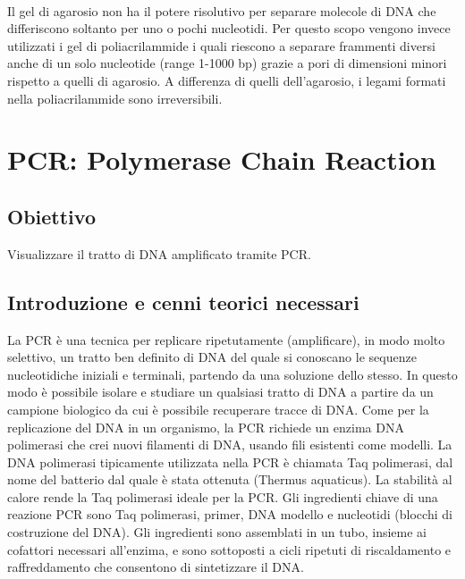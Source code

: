 \documentclass{extarticle}
\begin{document}
\paragraph{}Il gel di agarosio non ha il potere risolutivo per separare molecole di DNA che differiscono soltanto per uno o pochi nucleotidi. Per questo scopo
vengono invece utilizzati i gel di poliacrilammide i quali riescono a separare frammenti diversi anche di un solo nucleotide
(range 1-1000 bp) grazie a pori di dimensioni minori rispetto a quelli di agarosio. A differenza di quelli
dell'agarosio, i legami formati nella poliacrilammide sono irreversibili.

\newpage
\section{PCR: Polymerase Chain Reaction}
\subsection*{Obiettivo} Visualizzare il tratto di DNA amplificato tramite PCR.
\subsection*{Introduzione e cenni teorici necessari} La PCR è una tecnica per replicare ripetutamente (amplificare), in modo molto selettivo, un tratto ben definito di DNA del quale si conoscano le sequenze nucleotidiche iniziali e terminali, 
partendo da una soluzione dello stesso. In questo modo è possibile isolare e studiare un qualsiasi tratto di DNA a partire da un campione biologico da cui è possibile recuperare tracce di DNA. 
Come per la replicazione del DNA in un organismo, la PCR richiede un enzima DNA polimerasi che crei nuovi filamenti di DNA, 
usando fili esistenti come modelli. La DNA polimerasi tipicamente utilizzata nella PCR è chiamata Taq polimerasi, dal nome del batterio dal quale è stata ottenuta (Thermus aquaticus). La stabilità al calore rende la Taq polimerasi ideale per la PCR.
Gli ingredienti chiave di una reazione PCR sono Taq polimerasi, primer, DNA modello e nucleotidi (blocchi di costruzione del DNA). Gli ingredienti sono assemblati in un tubo, insieme ai cofattori necessari all'enzima, e sono sottoposti a cicli ripetuti di riscaldamento e raffreddamento che consentono di sintetizzare il DNA.
\end{document}
